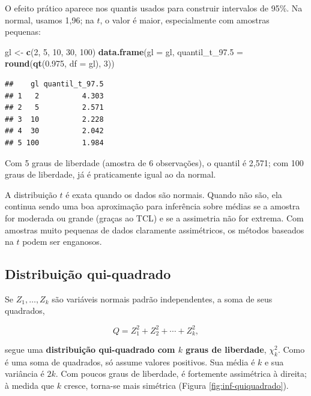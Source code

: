 \documentclass[
]{book}
\newenvironment{Shaded}{\begin{snugshade}}{\end{snugshade}}
\newcommand{\AttributeTok}[1]{\textcolor[rgb]{0.13,0.29,0.53}{#1}}
\newcommand{\DecValTok}[1]{\textcolor[rgb]{0.00,0.00,0.81}{#1}}
\newcommand{\FloatTok}[1]{\textcolor[rgb]{0.00,0.00,0.81}{#1}}
\newcommand{\FunctionTok}[1]{\textcolor[rgb]{0.13,0.29,0.53}{\textbf{#1}}}
\newcommand{\NormalTok}[1]{#1}
\newcommand{\OtherTok}[1]{\textcolor[rgb]{0.56,0.35,0.01}{#1}}
\begin{document}
O efeito prático aparece nos quantis usados para construir intervalos de 95\%. Na normal, usamos 1,96; na \(t\), o valor é maior, especialmente com amostras pequenas:

\begin{Shaded}
\begin{Highlighting}[]
\NormalTok{gl }\OtherTok{\textless{}{-}} \FunctionTok{c}\NormalTok{(}\DecValTok{2}\NormalTok{, }\DecValTok{5}\NormalTok{, }\DecValTok{10}\NormalTok{, }\DecValTok{30}\NormalTok{, }\DecValTok{100}\NormalTok{)}
\FunctionTok{data.frame}\NormalTok{(}\AttributeTok{gl =}\NormalTok{ gl, }\AttributeTok{quantil\_t\_97.5 =} \FunctionTok{round}\NormalTok{(}\FunctionTok{qt}\NormalTok{(}\FloatTok{0.975}\NormalTok{, }\AttributeTok{df =}\NormalTok{ gl), }\DecValTok{3}\NormalTok{))}
\end{Highlighting}
\end{Shaded}

\begin{verbatim}
##    gl quantil_t_97.5
## 1   2          4.303
## 2   5          2.571
## 3  10          2.228
## 4  30          2.042
## 5 100          1.984
\end{verbatim}

Com 5 graus de liberdade (amostra de 6 observações), o quantil é 2,571; com 100 graus de liberdade, já é praticamente igual ao da normal.

A distribuição \(t\) é exata quando os dados são normais. Quando não são, ela continua sendo uma boa aproximação para inferência sobre médias se a amostra for moderada ou grande (graças ao TCL) e se a assimetria não for extrema. Com amostras muito pequenas de dados claramente assimétricos, os métodos baseados na \(t\) podem ser enganosos.

\subsection{Distribuição qui-quadrado}\label{distribuiuxe7uxe3o-qui-quadrado}

Se \(Z_1, \ldots, Z_k\) são variáveis normais padrão independentes, a soma de seus quadrados,

\[
Q = Z_1^2 + Z_2^2 + \cdots + Z_k^2,
\]

segue uma \textbf{distribuição qui-quadrado com \(k\) graus de liberdade}, \(\chi^2_k\). Como é uma soma de quadrados, só assume valores positivos. Sua média é \(k\) e sua variância é \(2k\). Com poucos graus de liberdade, é fortemente assimétrica à direita; à medida que \(k\) cresce, torna-se mais simétrica (Figura \ref{fig:inf-quiquadrado}).
\end{document}
